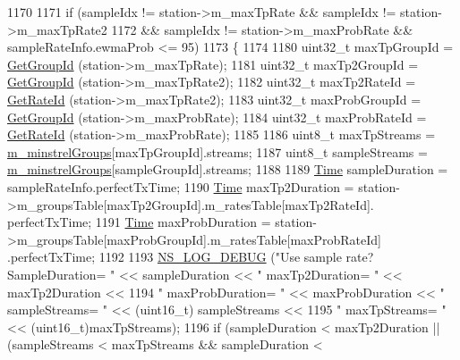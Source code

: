\begin{DoxyCode}
1170 
1171           \textcolor{keywordflow}{if} (sampleIdx != station->m\_maxTpRate && sampleIdx != station->m\_maxTpRate2
1172               && sampleIdx != station->m\_maxProbRate && sampleRateInfo.ewmaProb <= 95)
1173             \{
1174 
1180               uint32\_t maxTpGroupId = \hyperlink{classns3_1_1MinstrelHtWifiManager_a43157e6007b4b922043cb02a99ea6d1f}{GetGroupId} (station->m\_maxTpRate);
1181               uint32\_t maxTp2GroupId = \hyperlink{classns3_1_1MinstrelHtWifiManager_a43157e6007b4b922043cb02a99ea6d1f}{GetGroupId} (station->m\_maxTpRate2);
1182               uint32\_t maxTp2RateId = \hyperlink{classns3_1_1MinstrelHtWifiManager_a6162341f1348bbe713d09642b09ac658}{GetRateId} (station->m\_maxTpRate2);
1183               uint32\_t maxProbGroupId = \hyperlink{classns3_1_1MinstrelHtWifiManager_a43157e6007b4b922043cb02a99ea6d1f}{GetGroupId} (station->m\_maxProbRate);
1184               uint32\_t maxProbRateId = \hyperlink{classns3_1_1MinstrelHtWifiManager_a6162341f1348bbe713d09642b09ac658}{GetRateId} (station->m\_maxProbRate);
1185 
1186               uint8\_t maxTpStreams = \hyperlink{classns3_1_1MinstrelHtWifiManager_a231741ce3f38417925019aa598570468}{m\_minstrelGroups}[maxTpGroupId].streams;
1187               uint8\_t sampleStreams = \hyperlink{classns3_1_1MinstrelHtWifiManager_a231741ce3f38417925019aa598570468}{m\_minstrelGroups}[sampleGroupId].streams;
1188 
1189               \hyperlink{namespacens3_1_1TracedValueCallback_a7ffd3e7c142ffe7c8a1d2db9b8de38ec}{Time} sampleDuration = sampleRateInfo.perfectTxTime;
1190               \hyperlink{namespacens3_1_1TracedValueCallback_a7ffd3e7c142ffe7c8a1d2db9b8de38ec}{Time} maxTp2Duration = station->m\_groupsTable[maxTp2GroupId].m\_ratesTable[maxTp2RateId].
      perfectTxTime;
1191               \hyperlink{namespacens3_1_1TracedValueCallback_a7ffd3e7c142ffe7c8a1d2db9b8de38ec}{Time} maxProbDuration = station->m\_groupsTable[maxProbGroupId].m\_ratesTable[maxProbRateId]
      .perfectTxTime;
1192 
1193               \hyperlink{group__logging_ga413f1886406d49f59a6a0a89b77b4d0a}{NS\_LOG\_DEBUG} (\textcolor{stringliteral}{"Use sample rate? SampleDuration= "} << sampleDuration << \textcolor{stringliteral}{"
       maxTp2Duration= "} << maxTp2Duration <<
1194                             \textcolor{stringliteral}{" maxProbDuration= "} << maxProbDuration << \textcolor{stringliteral}{" sampleStreams= "} << (uint16\_t)
      sampleStreams <<
1195                             \textcolor{stringliteral}{" maxTpStreams= "} << (uint16\_t)maxTpStreams);
1196               \textcolor{keywordflow}{if} (sampleDuration < maxTp2Duration || (sampleStreams < maxTpStreams && sampleDuration < 

\end{DoxyCode}
